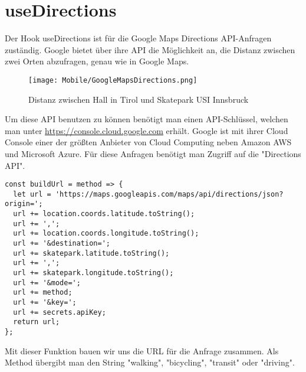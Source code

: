 \section{useDirections}
Der Hook useDirections ist für die Google Maps Directions API-Anfragen zuständig. Google bietet über
ihre API die Möglichkeit an, die Distanz zwischen zwei Orten abzufragen, genau wie in Google Maps.

\begin{figure}[H]
  \begin{center}
    \texttt{[image: Mobile/GoogleMapsDirections.png]}
    \caption{Distanz zwischen Hall in Tirol und Skatepark USI Innsbruck}
  \end{center}
\end{figure}

Um diese API benutzen zu können benötigt man einen API-Schlüssel, welchen man unter
\url{https://console.cloud.google.com} erhält. Google ist mit ihrer Cloud Console einer der größten
Anbieter von Cloud Computing neben Amazon AWS und Microsoft Azure. Für diese Anfragen benötigt man
Zugriff auf die "Directions API".

\begin{lstlisting}
const buildUrl = method => {
  let url = 'https://maps.googleapis.com/maps/api/directions/json?origin=';
  url += location.coords.latitude.toString();
  url += ',';
  url += location.coords.longitude.toString();
  url += '&destination=';
  url += skatepark.latitude.toString();
  url += ',';
  url += skatepark.longitude.toString();
  url += '&mode=';
  url += method;
  url += '&key=';
  url += secrets.apiKey;
  return url;
};
\end{lstlisting}

Mit dieser Funktion bauen wir uns die URL für die Anfrage zusammen. Als Method übergibt man den
String "walking", "bicycling", "transit" oder "driving".
